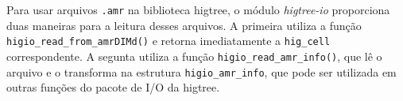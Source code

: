 Para usar arquivos \texttt{.amr} na biblioteca higtree, o módulo \textit{higtree-io} proporciona duas maneiras para a leitura desses arquivos. A primeira utiliza a função \texttt{higio\_read\_from\_amrDIMd()} e retorna imediatamente a \texttt{hig\_cell} correspondente. A segunta utiliza a função \texttt{higio\_read\_amr\_info()}, que lê o arquivo e o transforma na estrutura \texttt{higio\_amr\_info}, que pode ser utilizada em outras funções do pacote de I/O da higtree.













